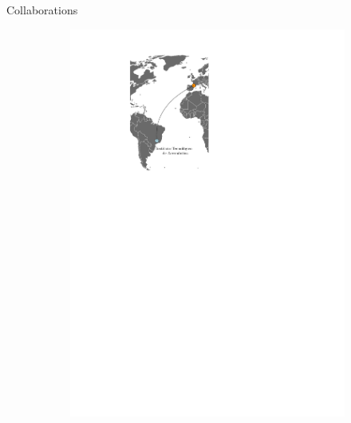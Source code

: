 \documentclass[aspectratio=169, french]{beamer}
\begin{document}
\begin{frame}{Collaborations}
\begin{figure}[t]
\begin{subfigure}{0.4\textwidth}
		\includegraphics[width=.9\textwidth]{mappe_reseau_world.pdf} 
	\end{subfigure}
\end{figure}
\end{frame}
	
\end{document}
